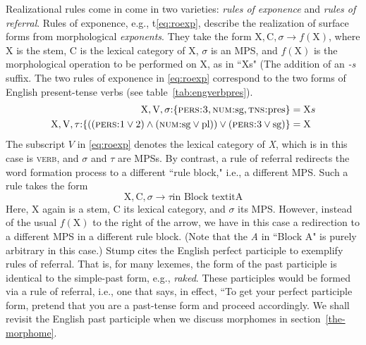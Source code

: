 Realizational rules come in come in two varieties:
\emph{rules of exponence} and \emph{rules of referral}. Rules of exponence, e.g., t\eqref{eq:roexp}, describe the 
realization of surface forms from morphological \emph{exponents}. They take the form $\text{X},\text{C},\sigma \to f(\text{X})$, where X is the stem, C is the lexical category of X, $\sigma$ is an \ac{MPS},  and $f(\text{X})$ is the morphological operation to be performed on X, as in ``Xs" (The addition of an \emph{-s} suffix. The two rules of exponence in \eqref{eq:roexp} %
correspond to the two forms 
of English present-tense verbs (see table~\ref{tab:engverbpres}). 
\begin{align}
\label{eq:roexp}
	\text{X},\text{V},\sigma\text{:}\{ \textsc{pers:3}\text{,} \, \textsc{num:}\text{sg,} \, \textsc{tns:}\text{pres} \} &= \text{X}s \\ \label{eq:roexp1}
	\text{X},\text{V},\tau\text{:}\{((\textsc{pers:}\text{1}\vee\text{2}) \land (\textsc{num:}\text{sg}\vee\text{pl})) \vee (\textsc{pers:}3 \vee \text{sg})\} &= \text{X} 
\end{align}
The subscript $V$ in \eqref{eq:roexp} denotes the lexical category of \textit{X}, which is %
in this case is \textsc{verb}, 
and $\sigma$ and $\tau$ are \ac{MPS}s. %
By contrast, a rule of referral redirects the word formation process to a different ``rule block," i.e.,
a different \ac{MPS}. Such a rule takes the form 
\begin{equation}
\label{eq:ror}
\text{X}, \text{C}, \sigma \to \tau \text{in Block textit{A}}
\end{equation}
Here, X again is a stem, 
C its lexical category, and $\sigma$ its MPS. However, instead of the usual $f(\text{X})$ %
to the right of the arrow, we have in this case a redirection to a different \ac{MPS} in a different rule block. (Note that the \textit{A} in ``Block A" is purely arbitrary in this case.) Stump cites the English perfect participle to exemplify rules of referral. That is, for many lexemes, the form of the past participle is identical to the simple-past form, e.g., \textit{raked}. These participles would be formed via a rule of referral, i.e., one that says, in effect, ``To get your perfect participle form, pretend that you are a past-tense form and proceed accordingly. 
We shall revisit the English past participle when we discuss morphomes in section~\ref{the-morphome}. 

